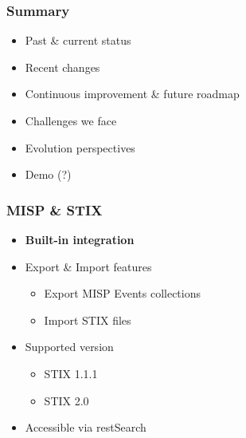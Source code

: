 
\begin{frame}[t,plain]
\titlepage
\end{frame}

\begin{frame}
    \frametitle{Summary}
    \begin{itemize}
        \item Past \& current status
        \item Recent changes
        \item Continuous improvement \& future roadmap
        \item Challenges we face
        \item Evolution perspectives
        \item Demo (?)
    \end{itemize}
\end{frame}

\begin{frame}
    \frametitle{MISP \& STIX}
    \begin{itemize}
        \item{\bf Built-in integration}
        \item Export \& Import features
        \begin{itemize}
            \item Export MISP Events collections
            \item Import STIX files
        \end{itemize}
        \item Supported version
        \begin{itemize}
            \item STIX 1.1.1
            \item STIX 2.0
        \end{itemize}
        \item Accessible via restSearch
    \end{itemize}
\end{frame}

